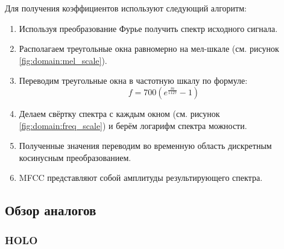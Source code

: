 Для получения коэффициентов используют следующий алгоритм:
\begin{enumerate}[label=\arabic*.]
\item Используя преобразование Фурье получить спектр исходного сигнала.
\item Располагаем треугольные окна равномерно на мел-шкале (см. рисунок \ref{fig:domain:mel_scale}).
\item Переводим треугольные окна в частотную шкалу по формуле:
\begin{equation}\label{eq:flux}
f= 700(e^{\frac{m}{1127}} - 1)
\end{equation}  
\item Делаем свёртку спектра с каждым окном (см. рисунок \ref{fig:domain:freq_scale}) и берём логарифм спектра можности.
\item Полученные значения переводим во временную область дискретным косинусным преобразованием.
\item MFCC представляют собой амплитуды результирующего спектра.
\end{enumerate}



\subsection{Обзор аналогов}
\label{sub:domain:overview_analog}
\subsubsection {HOLO}

